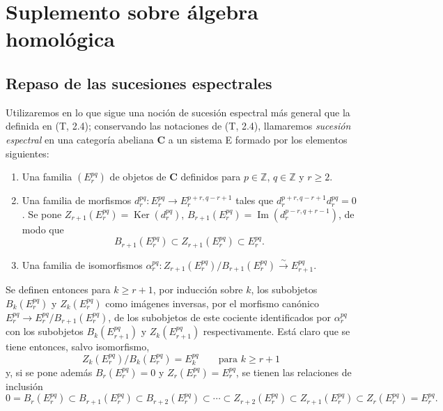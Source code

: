 \section{Suplemento sobre álgebra homológica}
\label{section:0.11}
\label{section:0.11-fr}

\subsection{Repaso de las sucesiones espectrales}
\label{subsection:0.11.1}
\label{subsection:0.11.1-fr}

\begin{env}[11.1.1]
\label{0.11.1.1-fr}
Utilizaremos en lo que sigue una noción de sucesión espectral más general que
la definida en (T, 2.4); conservando las notaciones de (T, 2.4),
llamaremos \emph{sucesión espectral} en una categoría abeliana $\boldsymbol{C}$ a un
sistema E formado por los elementos siguientes:
\begin{enumerate}
  \item[$a)$] Una familia $(E_r^{pq})$ de objetos de $\boldsymbol{C}$ definidos para
    $p\in\mathbb Z$, $q\in\mathbb Z$ y $r\geq2$.
  \item[$b)$] Una familia de morfismos
    $d_r^{pq}:E_r^{pq}\to E_r^{p+r,q-r+1}$ tales que
    $d_r^{p+r,q-r+1}d_r^{pq}=0$. Se pone
    $Z_{r+1}(E_r^{pq})=\operatorname{Ker}(d_r^{pq})$,
    $B_{r+1}(E_r^{pq})=\operatorname{Im}(d_r^{p-r,q+r-1})$, de modo que
    \[
      B_{r+1}(E_r^{pq})\subset Z_{r+1}(E_r^{pq})\subset E_r^{pq}.
    \]
  \item[$c)$] Una familia de isomorfismos
    $\alpha_r^{pq}:Z_{r+1}(E_r^{pq})/B_{r+1}(E_r^{pq})
    \xrightarrow{\sim}E_{r+1}^{pq}$.
\end{enumerate}

Se definen entonces para $k\geq r+1$, por inducción sobre $k$, los subobjetos
$B_k(E_r^{pq})$ y $Z_k(E_r^{pq})$ como imágenes inversas, por el morfismo
canónico $E_r^{pq}\to E_r^{pq}/B_{r+1}(E_r^{pq})$, de los subobjetos de este
cociente identificados por $\alpha_r^{pq}$ con los subobjetos $B_k(E_{r+1}^{pq})$ y
$Z_k(E_{r+1}^{pq})$ respectivamente. Está claro que se tiene entonces, salvo
isomorfismo,
\[
\label{0.11.1.1.1-fr}
  Z_k(E_r^{pq})/B_k(E_r^{pq})=E_k^{pq}
  \qquad\text{para }k\geq r+1
  \tag{11.1.1.1}
\]
y, si se pone además $B_r(E_r^{pq})=0$ y $Z_r(E_r^{pq})=E_r^{pq}$, se tienen
las relaciones de inclusión
\[
\label{0.11.1.1.2-fr}
  0=B_r(E_r^{pq})\subset B_{r+1}(E_r^{pq})\subset B_{r+2}(E_r^{pq})
  \subset\cdots\subset Z_{r+2}(E_r^{pq})\subset Z_{r+1}(E_r^{pq})
  \subset Z_r(E_r^{pq})=E_r^{pq}.
  \tag{11.1.1.2}
\]


\end{env}
